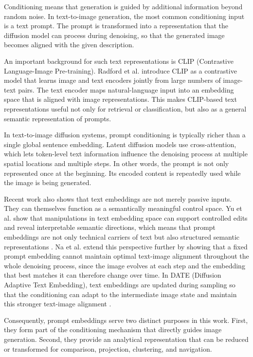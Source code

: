 Conditioning means that generation is guided by additional information beyond random noise. In text-to-image generation, the most common conditioning input is a text prompt. The prompt is transformed into a representation that the diffusion model can process during denoising, so that the generated image becomes aligned with the given description. \cite{rombach2022latent}

An important background for such text representations is CLIP (Contrastive Language-Image Pre-training). Radford et al. introduce CLIP as a contrastive model that learns image and text encoders jointly from large numbers of image-text pairs. The text encoder maps natural-language input into an embedding space that is aligned with image representations. This makes CLIP-based text representations useful not only for retrieval or classification, but also as a general semantic representation of prompts. \cite{radford2021clip}

In text-to-image diffusion systems, prompt conditioning is typically richer than a single global sentence embedding. Latent diffusion models use cross-attention, which lets token-level text information influence the denoising process at multiple spatial locations and multiple steps. In other words, the prompt is not only represented once at the beginning. Its encoded content is repeatedly used while the image is being generated. \cite{rombach2022latent}

Recent work also shows that text embeddings are not merely passive inputs. They can themselves function as a semantically meaningful control space. Yu et al. show that manipulations in text embedding space can support controlled edits and reveal interpretable semantic directions, which means that prompt embeddings are not only technical carriers of text but also structured semantic representations \cite{yu2024textembedding}. Na et al. extend this perspective further by showing that a fixed prompt embedding cannot maintain optimal text-image alignment throughout the whole denoising process, since the image evolves at each step and the embedding that best matches it can therefore change over time. In DATE (Diffusion Adaptive Text Embedding), text embeddings are updated during sampling so that the conditioning can adapt to the intermediate image state and maintain this stronger text-image alignment \cite{na2025date}.

Consequently, prompt embeddings serve two distinct purposes in this work. First, they form part of the conditioning mechanism that directly guides image generation. Second, they provide an analytical representation that can be reduced or transformed for comparison, projection, clustering, and navigation.

